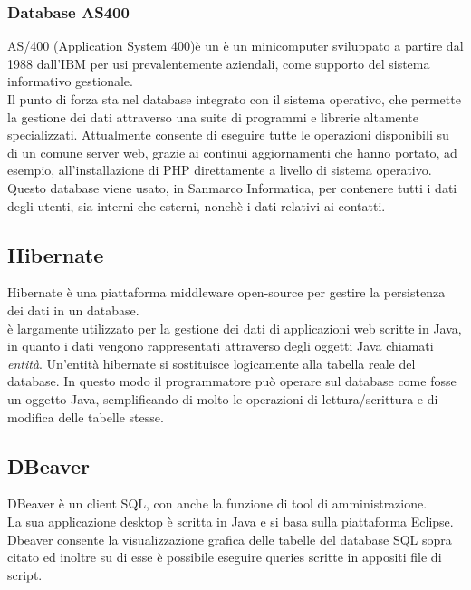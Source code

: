 \subsubsection{Database AS400}
AS/400 (Application System 400)è un è un minicomputer sviluppato a partire dal 1988 dall’IBM per usi prevalentemente aziendali, come supporto del sistema informativo gestionale.\\
Il punto di forza sta nel database integrato con il sistema operativo, che permette la gestione dei dati attraverso una suite di programmi e librerie altamente specializzati. Attualmente consente di eseguire tutte le operazioni disponibili su di un comune server web, grazie ai continui aggiornamenti che hanno portato, ad esempio, all'installazione di PHP direttamente a livello di sistema operativo.
Questo database viene usato, in Sanmarco Informatica, per contenere tutti i dati degli utenti, sia interni che esterni, nonchè i dati relativi ai contatti. %
\subsection{Hibernate}
Hibernate è una piattaforma \gls{middleware} open-source per gestire la persistenza dei dati in un database.\\
è largamente utilizzato per la gestione dei dati di applicazioni web scritte in Java, in quanto i dati vengono rappresentati attraverso degli oggetti Java chiamati \emph{entità}.
Un'entità hibernate si sostituisce logicamente alla tabella reale del database. In questo modo il programmatore può operare sul database come fosse un oggetto Java, semplificando di molto le operazioni di lettura/scrittura e di modifica delle tabelle stesse.
\subsection{DBeaver}
DBeaver è un client SQL, con anche la funzione di tool di amministrazione.\\
La sua applicazione desktop è scritta in Java e si basa sulla piattaforma Eclipse.\\
Dbeaver consente la visualizzazione grafica delle tabelle del database SQL sopra citato ed inoltre su di esse è possibile eseguire queries scritte in appositi file di script.
